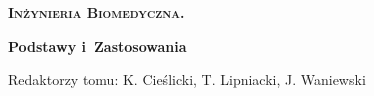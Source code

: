 \thispagestyle{empty}

\begin{center}
	
	{\Huge \textbf{\textsc{Inżynieria Biomedyczna.}}}
	
	\vspace{1cm}
	
	{\huge  \textbf{Podstawy i~Zastosowania}}
	
	\vspace{3cm}
{\LARGE Redaktorzy tomu: K. Cieślicki, T. Lipniacki, J. Waniewski}
\end{center}
